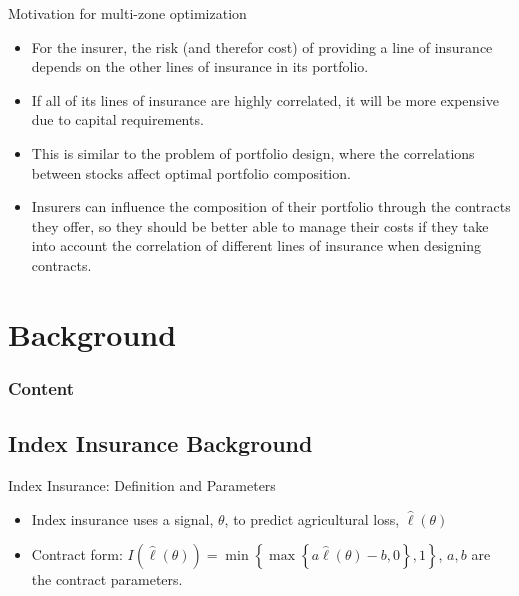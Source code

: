 \documentclass{beamer}
\begin{document}
\begin{frame}{Motivation for multi-zone optimization}
    \begin{itemize}
        \item For the insurer, the risk (and therefor cost) of providing a line of insurance depends on the other lines of insurance in its portfolio. 
        \item If all of its lines of insurance are highly correlated, it will be more expensive due to capital requirements. 
        \item This is similar to the problem of portfolio design, where the correlations between stocks affect optimal portfolio composition. 
        \item Insurers can influence the composition of their portfolio through the contracts they offer, so they should be better able to manage
        their costs if they take into account the correlation of different lines of insurance when designing contracts.
    \end{itemize}
    
\end{frame}

\section{Background}
\begin{frame}
    \frametitle{Content}
    \tableofcontents[currentsection]
  \end{frame}
\subsection{Index Insurance Background}
\begin{frame}{Index Insurance: Definition and Parameters}
    \begin{itemize}
        \setlength\itemsep{1em}
        \item Index insurance uses a signal, $\theta$, to predict agricultural loss, $\hat{\ell}(\theta)$
        \item Contract form: $I(\hat{\ell}(\theta)) = \min \left \{ \max \left \{a\hat{\ell}(\theta) - b,0 \right \}, 1 \right \}$, $a,b$ are the contract parameters.
    \end{itemize}
    \end{frame}
    
\end{document}
